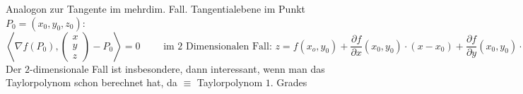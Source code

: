 \documentclass[a4paper]{article}
\begin{document}
		\begin{fdef}[Tangentialebene]
		Analogon zur Tangente im mehrdim. Fall. Tangentialebene im Punkt $P_0 = (x_0, y_0, z_0)$:
			\vspace{-2.5mm}
		$$\left \langle \nabla f(P_0),
			\left(
			\begin{array}{c}
				x\\
				y\\
				z
			\end{array}
			\right ) -P_0 \right \rangle = 0
			\qquad \text{ im 2 Dimensionalen Fall: } z = f(x_o, y_0) + \frac{\partial f}{\partial x}(x_0,y_0) \cdot (x - x_0) + \frac{\partial f}{\partial y}(x_0,y_0) \cdot (y - y_0)
			$$
			Der $2$-dimensionale Fall ist insbesondere, dann interessant, wenn man das Taylorpolynom schon berechnet hat, da $\equiv$ Taylorpolynom $1$. Grades
		\end{fdef}
% 
\end{document}
